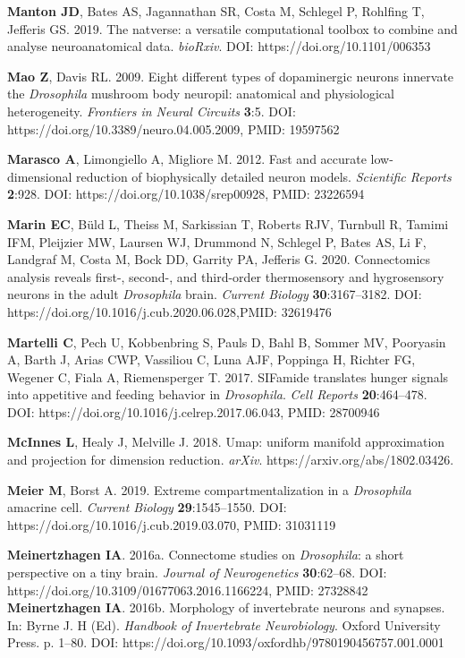 \documentclass{article}
\begin{document}
\begin{hangpars}
\textbf{Manton JD}, Bates AS, Jagannathan SR, Costa M, Schlegel P, Rohlfing T, Jefferis GS. 2019. The natverse: a versatile computational toolbox to combine and analyse neuroanatomical data. \emph{bioRxiv}. DOI: https://doi.org/10.1101/006353

\textbf{Mao Z}, Davis RL. 2009. Eight different types of dopaminergic neurons innervate the \emph{Drosophila} mushroom body neuropil: anatomical and physiological heterogeneity. \emph{Frontiers in Neural Circuits} \textbf{3}:5. DOI: https://doi.org/10.3389/neuro.04.005.2009, PMID: 19597562

\textbf{Marasco A}, Limongiello A, Migliore M. 2012. Fast and accurate low-dimensional reduction of biophysically detailed neuron models. \emph{Scientific Reports} \textbf{2}:928. DOI: https://doi.org/10.1038/srep00928, PMID: 23226594

\textbf{Marin EC}, Büld L, Theiss M, Sarkissian T, Roberts RJV, Turnbull R, Tamimi IFM, Pleijzier MW, Laursen WJ, Drummond N, Schlegel P, Bates AS, Li F, Landgraf M, Costa M, Bock DD, Garrity PA, Jefferis G. 2020. Connectomics analysis reveals first-, second-, and third-order thermosensory and hygrosensory neurons in the adult \emph{Drosophila} brain. \emph{Current Biology} \textbf{30}:3167–3182. DOI: https://doi.org/10.1016/j.cub.2020.06.028,PMID: 32619476

\textbf{Martelli C}, Pech U, Kobbenbring S, Pauls D, Bahl B, Sommer MV, Pooryasin A, Barth J, Arias CWP, Vassiliou C, Luna AJF, Poppinga H, Richter FG, Wegener C, Fiala A, Riemensperger T. 2017. SIFamide translates hunger signals into appetitive and feeding behavior in \emph{Drosophila}. \emph{Cell Reports} \textbf{20}:464–478. DOI: https://doi.org/10.1016/j.celrep.2017.06.043, PMID: 28700946

\textbf{McInnes L}, Healy J, Melville J. 2018. Umap: uniform manifold approximation and projection for dimension reduction. \emph{arXiv}. https://arxiv.org/abs/1802.03426.

\textbf{Meier M}, Borst A. 2019. Extreme compartmentalization in a \emph{Drosophila} amacrine cell. \emph{Current Biology} \textbf{29}:1545–1550. DOI: https://doi.org/10.1016/j.cub.2019.03.070, PMID: 31031119

\textbf{Meinertzhagen IA}. 2016a. Connectome studies on \emph{Drosophila}: a short perspective on a tiny brain. \emph{Journal of} \emph{Neurogenetics} \textbf{30}:62–68. DOI: https://doi.org/10.3109/01677063.2016.1166224, PMID: 27328842 \textbf{Meinertzhagen IA}. 2016b. Morphology of invertebrate neurons and synapses. In: Byrne J. H (Ed). \emph{Handbook of} \emph{Invertebrate Neurobiology}. Oxford University Press. p. 1–80. DOI: https://doi.org/10.1093/oxfordhb/9780190456757.001.0001


\end{hangpars}
\end{document}
